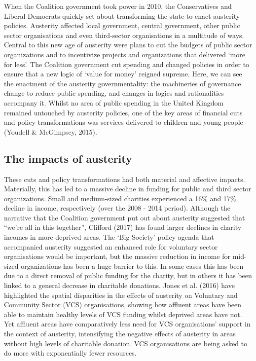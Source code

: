 When the Coalition government took power in 2010, the Conservatives and
Liberal Democrats quickly set about transforming the state to enact
austerity policies. Austerity affected local government, central
government, other public sector organisations and even third-sector
organisations in a multitude of ways. Central to this new age of
austerity were plans to cut the budgets of public sector organizations
and to incentivize projects and organizations that delivered `more for
less'. The Coalition government cut spending and changed policies in
order to ensure that a new logic of `value for money' reigned supreme.
Here, we can see the enactment of the austerity governmentality: the
machineries of governance change to reduce public spending, and changes
in logics and rationalities accompany it. Whilst no area of public
spending in the United Kingdom remained untouched by austerity policies,
one of the key areas of financial cuts and policy transformations was
services delivered to children and young people (Youdell \& McGimpsey,
2015).

\subsection{The impacts of austerity }
\label{the-impacts-of-austerity}

These cuts and policy transformations had both material and affective
impacts. Materially, this has led to a massive decline in funding for
public and third sector organizations. Small and medium-sized charities
experienced a 16\% and 17\% decline in income, respectively (over the
2008 - 2014 period). Although the narrative that the Coalition
government put out about austerity suggested that ``we're all in this
together'', Clifford (2017) has found larger declines in charity incomes
in more deprived areas. The `Big Society' policy agenda that accompanied
austerity suggested an enhanced role for voluntary sector organisations
would be important, but the massive reduction in income for mid-sized
organizations has been a huge barrier to this. In some cases this has
been due to a direct removal of public funding for the charity, but in
others it has been linked to a general decrease in charitable donations.
Jones et al. (2016) have highlighted the spatial disparities in the
effects of austerity on Voluntary and Community Sector (VCS)
organisations, showing how affluent areas have been able to maintain
healthy levels of VCS funding whilst deprived areas have not. Yet
affluent areas have comparatively less need for VCS organisations'
support in the context of austerity, intensifying the negative effects
of austerity in areas without high levels of charitable donation. VCS
organisations are being asked to do more with exponentially fewer
resources.

